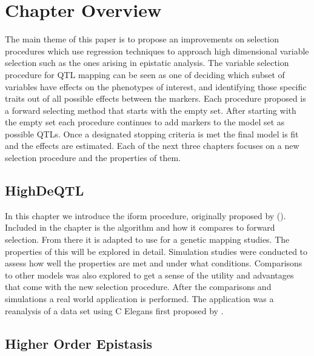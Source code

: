 \documentclass[11pt,]{book}
\theoremstyle{definition}
\theoremstyle{definition}
\theoremstyle{remark}
\begin{document}
\section{Chapter Overview}\label{chapter-overview}

The main theme of this paper is to propose an improvements on selection
procedures which use regression techniques to approach high dimensional
variable selection such as the ones arising in epistatic analysis. The
variable selection procedure for QTL mapping can be seen as one of
deciding which subset of variables have effects on the phenotypes of
interest, and identifying those specific traits out of all possible
effects between the markers. Each procedure proposed is a forward
selecting method that starts with the empty set. After starting with the
empty set each procedure continues to add markers to the model set as
possible QTLs. Once a designated stopping criteria is met the final
model is fit and the effects are estimated. Each of the next three
chapters focuses on a new selection procedure and the properties of
them.

\hypertarget{highdeqtl}{\subsection{HighDeQTL}\label{highdeqtl}}

In this chapter we introduce the iform procedure, originally proposed by
(\cite{hao2014interaction}). Included in the chapter is the algorithm
and how it compares to forward selection. From there it is adapted to
use for a genetic mapping studies. The properties of this will be
explored in detail. Simulation studies were conducted to assess how well
the properties are met and under what conditions. Comparisons to other
models was also explored to get a sense of the utility and advantages
that come with the new selection procedure. After the comparisons and
simulations a real world application is performed. The application was a
reanalysis of a data set using C Elegans first proposed by
\cite{rockman2010selection}.

\subsection{Higher Order Epistasis}\label{higher-order-epistasis}
\end{document}

